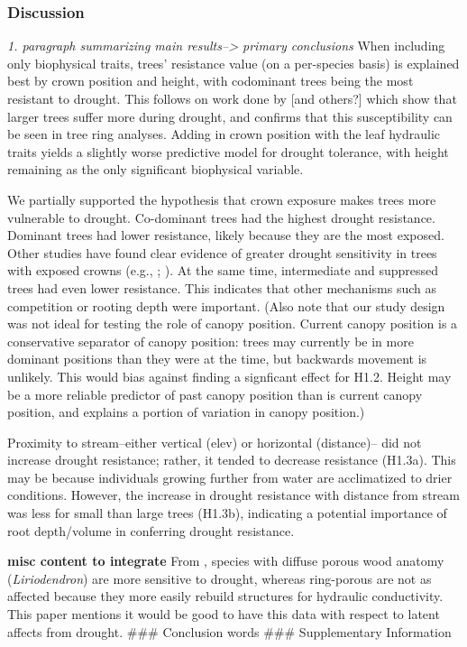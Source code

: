 \documentclass[]{article}
\begin{document}
\hypertarget{discussion}{%
\subsubsection{Discussion}\label{discussion}}

\emph{1. paragraph summarizing main results--\textgreater{} primary
conclusions} When including only biophysical traits, trees' resistance
value (on a per-species basis) is explained best by crown position and
height, with codominant trees being the most resistant to drought. This
follows on work done by \citep{bennett_larger_2015} {[}and others?{]}
which show that larger trees suffer more during drought, and confirms
that this susceptibility can be seen in tree ring analyses. Adding in
crown position with the leaf hydraulic traits yields a slightly worse
predictive model for drought tolerance, with height remaining as the
only significant biophysical variable.

We partially supported the hypothesis that crown exposure makes trees
more vulnerable to drought. Co-dominant trees had the highest drought
resistance. Dominant trees had lower resistance, likely because they are
the most exposed. Other studies have found clear evidence of greater
drought sensitivity in trees with exposed crowns (e.g.,
\citep{suarez_factors_2004}; \citep{scharnweber_confessions_2019}). At
the same time, intermediate and suppressed trees had even lower
resistance. This indicates that other mechanisms such as competition or
rooting depth were important. (Also note that our study design was not
ideal for testing the role of canopy position. Current canopy position
is a conservative separator of canopy position: trees may currently be
in more dominant positions than they were at the time, but backwards
movement is unlikely. This would bias against finding a signficant
effect for H1.2. Height may be a more reliable predictor of past canopy
position than is current canopy position, and explains a portion of
variation in canopy position.)

Proximity to stream--either vertical (elev) or horizontal (distance)--
did not increase drought resistance; rather, it tended to decrease
resistance (H1.3a). This may be because individuals growing further from
water are acclimatized to drier conditions. However, the increase in
drought resistance with distance from stream was less for small than
large trees (H1.3b), indicating a potential importance of root
depth/volume in conferring drought resistance.

\textbf{misc content to integrate} From \citep{kannenberg_linking_2019},
species with diffuse porous wood anatomy (\emph{Liriodendron}) are more
sensitive to drought, whereas ring-porous are not as affected because
they more easily rebuild structures for hydraulic conductivity. This
paper mentions it would be good to have this data with respect to latent
affects from drought. \#\#\# Conclusion words \#\#\# Supplementary
Information
\end{document}
